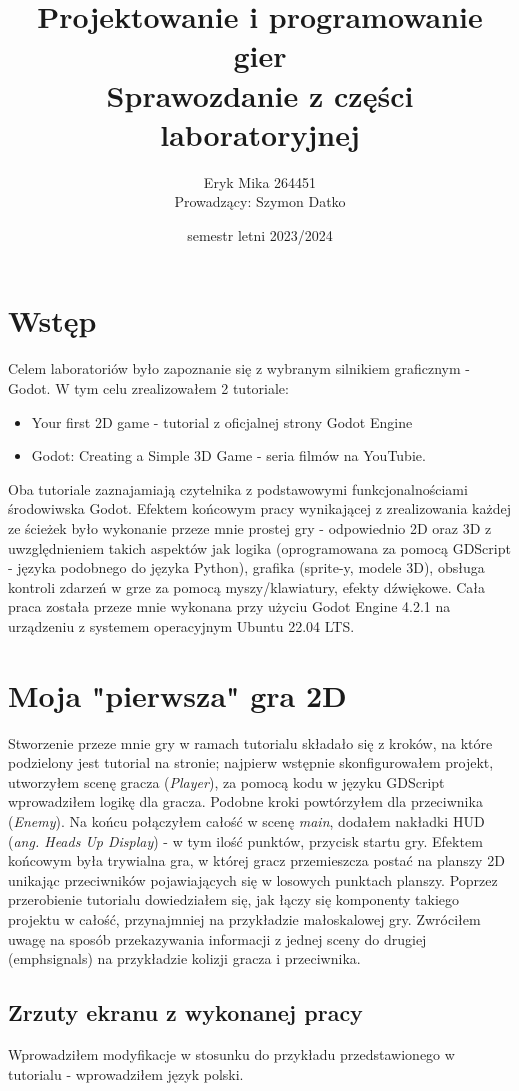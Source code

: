 \documentclass[a4paper]{article}
\title{Projektowanie i programowanie gier \\
\vspace{5px}
\large Sprawozdanie z części laboratoryjnej }
\date{semestr letni 2023/2024}
\author{
    \centering
    \begin{tabular}{c}
      Eryk Mika 264451  \\[2ex]
      Prowadzący: Szymon Datko
    \end{tabular}
  }
\begin{document}
\maketitle
\renewcommand{\figurename}{Zrzut}
\begin{sloppypar}
	\section{Wstęp}
	\justifying
	Celem laboratoriów było zapoznanie się z wybranym silnikiem graficznym - Godot. W tym celu zrealizowałem 2 tutoriale:
	\begin{itemize}
		\item Your first 2D game - tutorial z oficjalnej strony Godot Engine
		\item Godot: Creating a Simple 3D Game - seria filmów na YouTubie.
	\end{itemize}
	Oba tutoriale zaznajamiają czytelnika z podstawowymi funkcjonalnościami środowiwska Godot. Efektem końcowym pracy wynikającej
	z zrealizowania każdej ze ścieżek było wykonanie przeze mnie prostej gry - odpowiednio 2D oraz 3D z uwzględnieniem takich
	aspektów jak logika (oprogramowana za pomocą GDScript - języka podobnego do języka Python), grafika (sprite-y, modele 3D),
	obsługa kontroli zdarzeń w grze za pomocą myszy/klawiatury, efekty dźwiękowe. Cała praca została przeze mnie wykonana przy
	użyciu Godot Engine 4.2.1 na urządzeniu z systemem operacyjnym Ubuntu 22.04 LTS.
	\section{Moja "pierwsza" gra 2D}
	Stworzenie przeze mnie gry w ramach tutorialu składało się z kroków, na które podzielony jest tutorial na stronie; najpierw
	wstępnie skonfigurowałem projekt, utworzyłem scenę gracza (\emph{Player}), za pomocą kodu w języku GDScript wprowadziłem
	logikę dla gracza. Podobne kroki powtórzyłem dla przeciwnika (\emph{Enemy}). Na końcu połączyłem całość w scenę \emph{main},
	dodałem nakładki HUD (\emph{ang. Heads Up Display}) - w tym ilość punktów, przycisk startu gry. Efektem końcowym była trywialna gra,
	w której gracz przemieszcza postać na planszy 2D unikając przeciwników pojawiających się w losowych punktach planszy.
	Poprzez przerobienie tutorialu dowiedziałem się, jak łączy się komponenty takiego projektu w całość, przynajmniej na przykładzie małoskalowej gry.
	Zwróciłem uwagę na sposób przekazywania informacji z jednej sceny do drugiej (emph{signals}) na przykładzie kolizji gracza i przeciwnika.
	\subsection{Zrzuty ekranu z wykonanej pracy}
	Wprowadziłem modyfikacje w stosunku do przykładu przedstawionego w tutorialu - wprowadziłem język polski.
\end{sloppypar}
\end{document}
